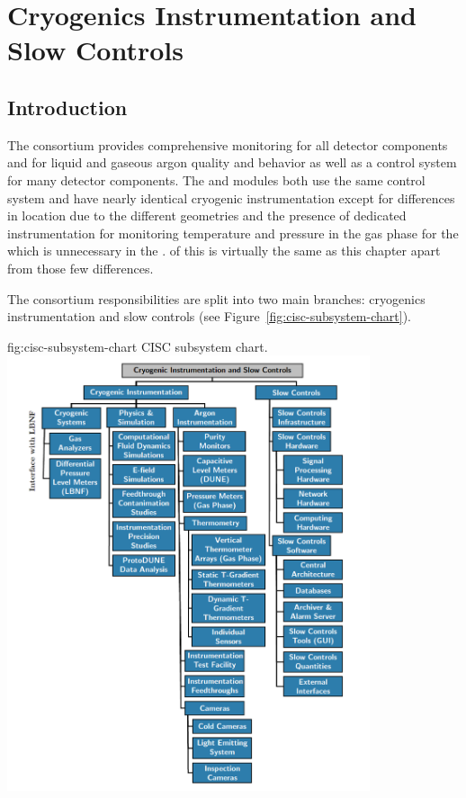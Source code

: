 \chapter{Cryogenics Instrumentation and Slow Controls}
\label{ch:dp-cisc}


\section{Introduction} 

The  consortium provides comprehensive monitoring for all detector components and for liquid and gaseous argon quality and behavior as well as a control system for many detector components.
The  and  modules both use the same control
system and have nearly identical cryogenic instrumentation except
for differences in location due to the different 
geometries and the presence of dedicated instrumentation for
monitoring temperature and pressure in the gas phase for the
 which is unnecessary in the .  
\spchcisc{} of this  is
virtually the same as this chapter apart from those few
differences.

The consortium responsibilities are split into 
two main branches: cryogenics instrumentation and slow controls (see Figure~\ref{fig:cisc-subsystem-chart}). 

\begin{dunefigure}{fig:cisc-subsystem-chart}
  {CISC subsystem chart.}
  \includegraphics[width=0.8\textwidth]{graphics/CISC_scope-v2-dp-zoomed.png}
\end{dunefigure}

